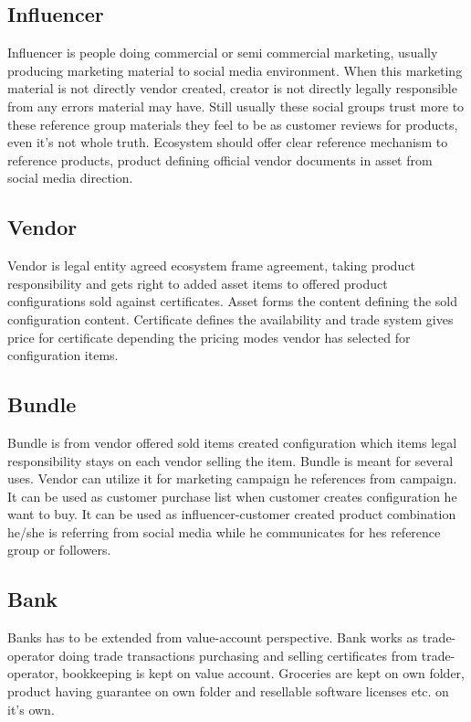 \subsection{Influencer}
\label{influencer}
Influencer is people doing commercial or semi commercial marketing, usually
producing marketing material to social media environment. When this marketing
material is not directly vendor created, creator is not directly legally
responsible from any errors material may have. Still usually these social
groups trust more to these reference group materials they feel to be as
customer reviews for products, even it's not whole truth. Ecosystem should
offer clear reference mechanism to reference products, product defining
official vendor documents in asset from social media direction.

\subsection{Vendor}
\label{vendor}
Vendor is legal entity agreed ecosystem frame agreement, taking product
responsibility and gets right to added asset items to offered product
configurations sold against certificates. Asset forms the content defining the
sold configuration content. Certificate defines the availability and trade
system gives price for certificate depending the pricing modes vendor has
selected for configuration items.

\subsection{Bundle}
\label{bundle}
Bundle is from vendor offered sold items created configuration which items
legal responsibility stays on each vendor selling the item. Bundle is meant
for several uses. Vendor can utilize it for marketing campaign he references
from campaign. It can be used as customer purchase list when customer creates
configuration he want to buy. It can be used as influencer-customer created
product combination he/she is referring from social media while he
communicates for hes reference group or followers.

\subsection{Bank}
\label{bank}
Banks has to be extended from value-account perspective. Bank works as
trade-operator doing trade transactions purchasing and selling certificates
from trade-operator, bookkeeping is kept on value account. Groceries are kept
on own folder, product having guarantee on own folder and resellable software
licenses etc. on it's own.

